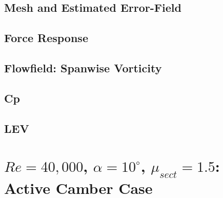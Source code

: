 \subsection{Mesh and Estimated Error-Field}

\label{sec:zonal_mesh_and_error}

\subsection{Force Response}

\label{sec:zonal_force_response}

\subsection{Flowfield: Spanwise Vorticity}

\label{sec:zonal_vorticity}

\subsection{Cp}

\label{sec:zonal_cp}

\subsection{LEV}

\label{sec:zonal_LEV}


\section{ $Re=40,000$,  $\alpha=10^\circ$, $\mu_{sect}=1.5$: Active Camber Case}


\label{sec:zonal_active_camber}


